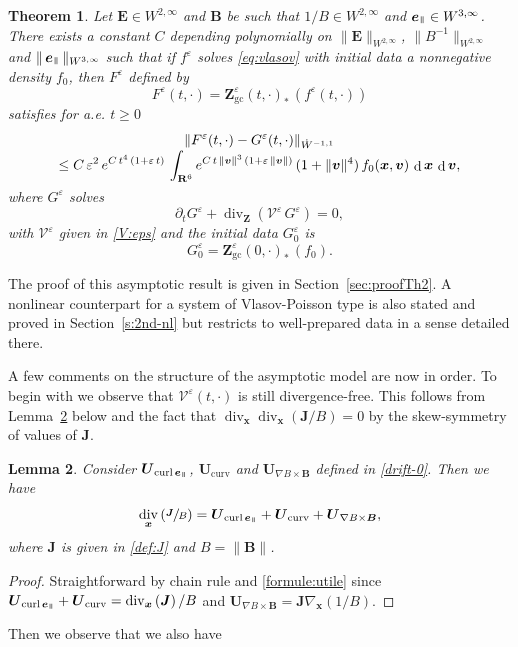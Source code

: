\documentclass[JEP,XML,SOM,Unicode]{cedram}
\let\mathcal\mathscr
\let\eps\varepsilon
\let\d\partial
\DeclareMathOperator\dD{d}\let\dd\dD
\DeclareMathOperator{\Div}{div}
\DeclareMathOperator{\Curl}{curl}
\theoremstyle{plain}
\newtheorem{theorem}{Theorem}[section]
\newtheorem{lemma}[theorem]{Lemma}
\theoremstyle{definition}
\newcommand{\be}{\begin{equation}}
\newcommand{\ee}{\end{equation}}
\newcommand{\bt}{\begin{theorem}}
\newcommand{\et}{\end{theorem}}
\newcommand{\bl}{\begin{lemma}}
\newcommand{\el}{\end{lemma}}
\newcommand\R{\mathbf R}
\newcommand\bB{{\boldsymbol B}}
\newcommand\bE{{\boldsymbol E}}
\newcommand\bJ{{\boldsymbol J}}
\newcommand\bU{{\boldsymbol U}}
\newcommand\bZ{{\boldsymbol Z}}
\newcommand\bfv{{\boldsymbol v}}
\newcommand\bfx{{\boldsymbol x}}
\newcommand\bfZ{{\boldsymbol Z}}
\newcommand\cV{{\mathcal V}}
\DeclareMathOperator{\beD}{\boldsymbol{e}}
\newcommand\eDpar{\beD_\mypar}
\newcommand{\gradB}{\bU_{\nabla B\times\bB}}
\newcommand{\curvB}{\bU_{\mathrm{curv}}}
\newcommand{\rotB}{\bU_{\Curl\eDpar}}
\newcommand{\mypar}{{\mkern3mu\vphantom{\perp}\vrule depth 0pt\mkern2mu\vrule depth 0pt\mkern3mu}}
\begin{document}
\bt
\label{th:2}
Let $\bE\in W^{2,\infty}$ and $\bB$ be such that $1/B\in W^{2,\infty}$ and $\eDpar\in W^{3,\infty}$. There exists a constant $C$ depending polynomially on $\|\bE\|_{W^{2,\infty}}$, $\|B^{-1}\|_{W^{2,\infty}}$ and $\|\eDpar\|_{W^{3,\infty}}$ such that if $f^\eps$ solves \eqref{eq:vlasov} with initial data a nonnegative density $f_0$, then $F^\eps$ defined by\vspace*{-3pt}
\[
F^\eps(t,\cdot)= \bfZ_\mathrm{gc}^\eps(t,\cdot)_* \,(f^\eps(t,\cdot))
\]
satisfies for a.e. $t\geq0$\vspace*{-3pt}
\begin{multline*}
\|F^\eps(t,\cdot)-G^\eps(t,\cdot)\|_{\dot{W}^{-1,1}}\\[-3pt]
\leq C\,\eps^2\,e^{C\,t^4\,(1+\eps\,t)}\,\int_{\R^6} e^{C\,t\,\|\bfv\|^3\,(1+\eps\,\|\bfv\|)}\,(1+\|\bfv\|^4)\,f_0(\bfx,\bfv)\,\dD\bfx\,\dD\bfv,\vspace*{-3pt}
\end{multline*}
where $G^\eps$ solves\vspace*{-3pt}
\be
\label{eq:2nd}
\d_t G^\eps+\Div_{\bfZ} \left(\cV^\eps\,G^\eps\right)
=0,
\ee
with $\cV^\eps$ given in \eqref{V:eps} and the initial data $G_{0}^\eps$ is\vspace*{-3pt}
\[
G_{0}^\eps= \bZ_\mathrm{gc}^\eps(0,\cdot)_* \,(f_0).
\]
\et
The proof of this asymptotic result is given in Section~\ref{sec:proofTh2}. A nonlinear counterpart for a system of Vlasov-Poisson type is also stated and proved in Section~\ref{s:2nd-nl} but restricts to well-prepared data in a sense detailed there.

A few comments on the structure of the asymptotic model are now in order. To begin with we observe that $\cV^\eps(t,\cdot)$ is still divergence-free. This follows from Lemma~\ref{lem:00} below and the fact that $\Div_\bfx\Div_\bfx(\bJ/B)=0$ by the skew-symmetry of values of
$\bJ$.

\bl
\label{lem:00}
Consider $\rotB$, $\curvB$ and $\gradB$ defined in \eqref{drift-0}. Then we have
\[
\Div_\bfx\left( \sfrac{\bJ}{B}\right) = \rotB+\curvB+\gradB,
\]
where $\bJ$ is given in \eqref{def:J} and $B=\|\bB\|$.
\el
\begin{proof}
Straightforward by chain rule and \eqref{formule:utile} since $\rotB+\curvB=\Div_\bfx\left(\bJ\right)/B$ and $\gradB=\bJ\nabla_{\bfx}(1/B)$.
\end{proof}

Then we observe that we also have
\end{document}
